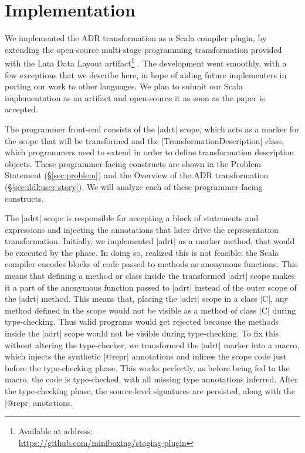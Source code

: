\section{Implementation}
\label{sec:impl}

We implemented the ADR transformation as a Scala compiler plugin, by extending the open-source multi-stage programming transformation provided with the Lata Data Layout artifact\footnote{Available at address:\\ \url{https://github.com/miniboxing/staging-plugin}} \cite{ldl}. The development went smoothly, with a few exceptions that we describe here, in hope of aiding future implementers in porting our work to other languages. We plan to submit our Scala implementation as an artifact and open-source it as soon as the paper is accepted.

The programmer front-end consists of the |adrt| scope, which acts as a marker for the scope that will be transformed and the |TransformationDescription| class, which programmers need to extend in order to define transformation description objects. These programmer-facing constructs are shown in the Problem Statement (\S\ref{sec:problem}) and the Overview of the ADR transformation (\S\ref{sec:ildl:user-story}). We will analyze each of these programmer-facing constructs.

The |adrt| scope is responsible for accepting a block of statements and expressions and injecting the annotations that later drive the representation transformation. Initially, we implemented |adrt| as a marker method, that would be executed by the \inject{} phase. In doing so, realized this is not feasible: the Scala compiler encodes blocks of code passed to methods as anonymous functions. This means that defining a method or class inside the transformed |adrt| scope makes it a part of the anonymous function passed to |adrt| instead of the outer scope of the |adrt| method. This means that, placing the |adrt| scope in a class |C|, any method defined in the scope would not be visible as a method of class |C| during type-checking. Thus valid programs would get rejected because the methods inside the |adrt| scope would not be visible during type-checking. To fix this without altering the type-checker, we transformed the |adrt| marker into a macro, which injects the synthetic |@repr| annotations and inlines the scope code just before the type-checking phase. This works perfectly, as before being fed to the macro, the code is type-checked, with all missing type annotations inferred. After the type-checking phase, the source-level signatures are persisted, along with the |@repr| anotations.

